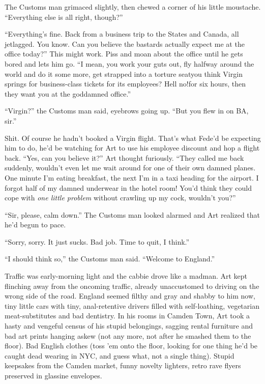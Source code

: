 The Customs man grimaced slightly, then chewed a corner of his
little moustache. “Everything else is all right, though?”

“Everything’s fine. Back from a business trip to the States and
Canada, all jetlagged. You know. Can you believe the bastards
actually expect me at the office today?” This might work. Piss and
moan about the office until he gets bored and lets him go. “I mean,
you work your guts out, fly halfway around the world and do it some
more, get strapped into a torture seat{\dash}you think Virgin springs for
business-class tickets for its employees? Hell no!{\dash}for six hours,
then they want you at the goddamned office.”

“Virgin?” the Customs man said, eyebrows going up. “But you flew in
on BA, sir.”

Shit. Of course he hadn’t booked a Virgin flight. That’s what
Fede’d be expecting him to do, he’d be watching for Art to use his
employee discount and hop a flight back. “Yes, can you believe it?”
Art thought furiously. “They called me back suddenly, wouldn’t even
let me wait around for one of their own damned planes. One minute
I’m eating breakfast, the next I’m in a taxi heading for the
airport. I forgot half of my damned underwear in the hotel room!
You’d think they could cope with \emph{one little problem} without
crawling up my cock, wouldn’t you?”

“Sir, please, calm down.” The Customs man looked alarmed and Art
realized that he’d begun to pace.

“Sorry, sorry. It just sucks. Bad job. Time to quit, I think.”

“I should think so,” the Customs man said. “Welcome to England.”

Traffic was early-morning light and the cabbie drove like a madman.
Art kept flinching away from the oncoming traffic, already
unaccustomed to driving on the wrong side of the road. England
seemed filthy and gray and shabby to him now, tiny little cars with
tiny, anal-retentive drivers filled with self-loathing, vegetarian
meat-substitutes and bad dentistry. In his rooms in Camden Town,
Art took a hasty and vengeful census of his stupid belongings,
sagging rental furniture and bad art prints hanging askew (not any
more, not after he smashed them to the floor). Bad English clothes
(toss ’em onto the floor, looking for one thing he’d be caught dead
wearing in NYC, and guess what, not a single thing). Stupid
keepsakes from the Camden market, funny novelty lighters, retro
rave flyers preserved in glassine envelopes.

